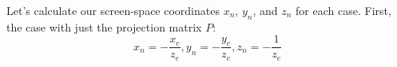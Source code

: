 \documentclass[11pt]{tingpset}
\begin{document}
  \pagebreak
    Let's calculate our screen-space coordinates $x_n$, $y_n$, and $z_n$ for each case. First, the case with just the projection matrix $P$:
    \[
      x_n = -\frac{x_e}{z_e}, y_n = -\frac{y_e}{z_e}, z_n = -\frac{1}{z_e}
    \]
\end{document}
